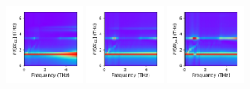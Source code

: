 \documentclass[a4paper]{article}
\begin{document}
\begin{figure}[H]
  \centering
  \includegraphics[width=0.23\textwidth]{cond_w_pcolor-A0-v0-imp0.pdf}
  \includegraphics[width=0.23\textwidth]{cond_w_pcolor-A0-v1-imp0.pdf}
  \includegraphics[width=0.23\textwidth]{cond_w_pcolor-A0-v2-imp0.pdf}
\end{figure}

\newpage
\end{document}
